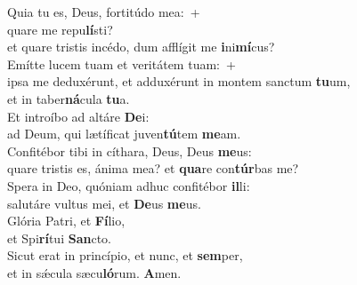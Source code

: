 \evenverse Quia tu es, Deus, fortitúdo mea:~+\\\evenverse  quare me repu\textbf{lí}sti?~\*\\
\evenverse et quare tristis incédo, dum afflígit me \textbf{i}ni\textbf{mí}cus?\\
\oddverse Emítte lucem tuam et veritátem tuam:~+\\
\oddverse  ipsa me deduxérunt, et adduxérunt in montem sanctum \textbf{tu}um,~\*\\
\oddverse et in taber\textbf{ná}cula \textbf{tu}a.\\
\evenverse Et introíbo ad altáre \textbf{De}i:~\*\\
\evenverse ad Deum, qui lætíficat juven\textbf{tú}tem \textbf{me}am.\\
\oddverse Confitébor tibi in cíthara, Deus, Deus \textbf{me}us:~\*\\
\oddverse quare tristis es, ánima mea? et \textbf{qua}re con\textbf{túr}bas me?\\
\evenverse Spera in Deo, quóniam adhuc confitébor \textbf{il}li:~\*\\
\evenverse salutáre vultus mei, et \textbf{De}us \textbf{me}us.\\
\oddverse Glória Patri, et \textbf{Fí}lio,~\*\\
\oddverse et Spi\textbf{rí}tui \textbf{San}cto.\\
\evenverse Sicut erat in princípio, et nunc, et \textbf{sem}per,~\*\\
\evenverse et in sǽcula sæcu\textbf{ló}rum. \textbf{A}men.\\
